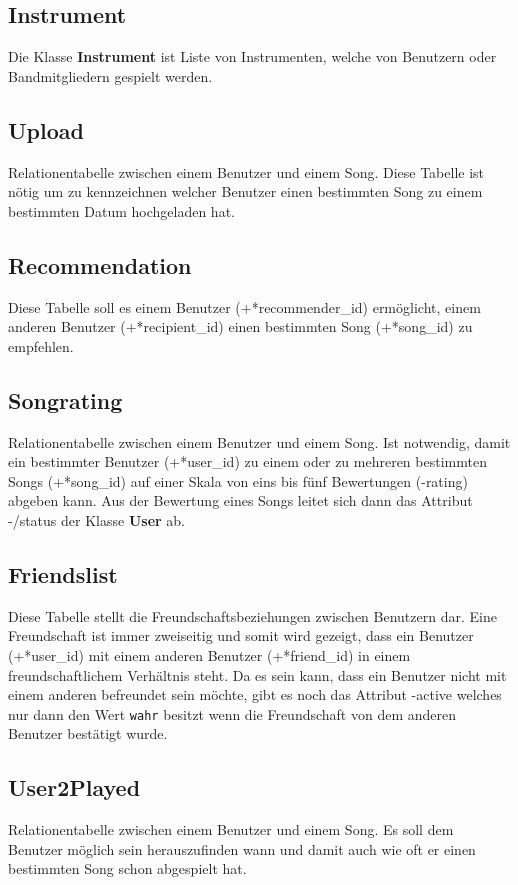 \documentclass[11pt,a4paper,DIV=9]{scrartcl}
\begin{document}
  \subsection{Instrument}
    Die Klasse \textbf{Instrument} ist Liste von Instrumenten, welche von Benutzern oder Bandmitgliedern gespielt werden.
  \subsection{Upload}
    Relationentabelle zwischen einem Benutzer und einem Song. Diese Tabelle ist n\"otig um zu kennzeichnen welcher Benutzer einen bestimmten Song zu einem bestimmten Datum hochgeladen hat.
  \subsection{Recommendation}
    Diese Tabelle soll es einem Benutzer (+*recommender\_id) ermöglicht, einem anderen Benutzer (+*recipient\_id) einen bestimmten Song (+*song\_id) zu empfehlen.
  \subsection{Songrating}
   Relationentabelle zwischen einem Benutzer und einem Song. Ist notwendig, damit ein bestimmter Benutzer (+*user\_id) zu einem oder zu mehreren bestimmten Songs (+*song\_id) auf einer Skala von eins bis f\"unf Bewertungen (-rating) abgeben kann. Aus der Bewertung eines Songs leitet sich dann das Attribut -/status der Klasse \textbf{User} ab.
  \subsection{Friendslist}
    Diese Tabelle stellt die Freundschaftsbeziehungen zwischen Benutzern dar. Eine Freundschaft ist immer zweiseitig und somit wird gezeigt, dass ein Benutzer (+*user\_id) mit einem anderen Benutzer (+*friend\_id) in einem freundschaftlichem Verhältnis steht. Da es sein kann, dass ein Benutzer nicht mit einem anderen befreundet sein möchte, gibt es noch das Attribut -active welches nur dann den Wert \texttt{wahr} besitzt wenn die Freundschaft von dem anderen Benutzer bestätigt wurde.
  \subsection{User2Played}
    Relationentabelle zwischen einem Benutzer und einem Song. Es soll dem Benutzer möglich sein herauszufinden wann und damit auch wie oft er einen bestimmten Song schon abgespielt hat.
\end{document}
